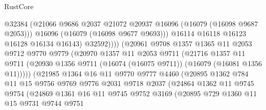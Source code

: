\begin{lexlean}{RustCore}
\begin{coremodule}
                                @32384
                                (@21066
                                  @9686
                                  @2037
                                  @21072
                                  @20937
                                  @16096
                                  (@16079 (@16098 @9687 @2053)))
                                @16096
                                (@16079 (@16098 @9677 @9693)))
                              @16114
                              @16118
                              @16123
                              @16128
                              @16134
                              @16143)
                            @32592))))
                    (@20961
                      @9708
                      @1357
                      @1365
                      @11
                      @2053
                      @9712
                      @9770
                      @9779
                      (@20970
                        @1357
                        @11
                        @2053
                        @9711
                        (@21716
                          @1357
                          @11
                          @9711
                          (@20930 @1356 @9711 (@16074 (@16075 @9711)) (@16079 (@16081 @1356 @11)))))
                      (@21985
                        @1364
                        @16
                        @11
                        @9770
                        @9777
                        @4460
                        (@20895
                          @1362
                          @784
                          @11
                          @15
                          @9756
                          @9769
                          @9776
                          @2031
                          @9718
                          @2037
                          (@24864
                            @1362
                            @11
                            @9745
                            @9754
                            (@24869
                              @1361
                              @16
                              @11
                              @9745
                              @9752
                              @3169
                              (@20895
                                @729
                                @1360
                                @11
                                @15
                                @9731
                                @9744
                                @9751

\end{coremodule}
\end{lexlean}
